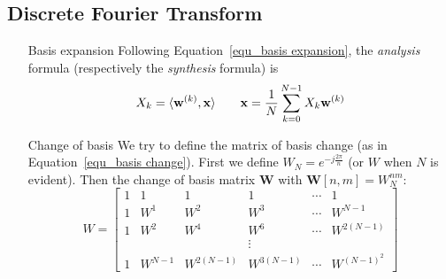 \documentclass[11pt,a4paper]{article}
\begin{document}
\subsection{Discrete Fourier Transform}
\begin{itemize}
    \item[Basis expansion]Following Equation~\ref{equ_basis expansion}, the \textit{analysis} formula (respectively the \textit{synthesis} formula) is
        \begin{equation}
            X_k = \langle\mathbf{w}^{(k)},\mathbf{x}\rangle \qquad \mathbf{x} = \frac{1}{N} \somme{N-1}{k=0}X_k \mathbf{w}^{(k)}
        \end{equation}
    \item[Change of basis]We try to define the matrix of basis change (as in Equation~\ref{equ_basis change}). First we define $W_N = e^{-j\frac{2\pi}{n}}$ (or $W$ when $N$ is evident). Then the change of basis matrix $\mathbf{W}$ with $\mathbf{W}[n,m] = W_N^{nm}$: 
        \begin{equation}
            W = 
            \begin{bmatrix}
                1 & 1 & 1 & 1 & \cdots & 1\\
                1 & W^1 & W^2 & W^3 & \cdots & W^{N-1}\\
                1 & W^2 & W^4 & W^6 & \cdots & W^{2(N-1)}\\
                & & & \vdots\\
                1 & W^{N-1} & W^{2(N-1)} & W^{3(N-1)} & \cdots & W^{(N-1)^2}
            \end{bmatrix}
        \end{equation}
\end{itemize}
\end{document}
